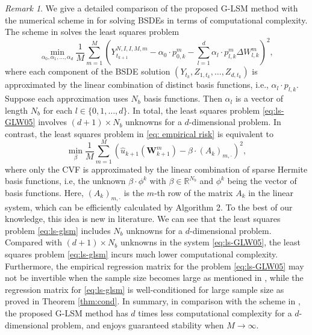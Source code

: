 \documentclass[10pt,a4paper]{amsart}
\numberwithin{equation}{section}
\numberwithin{algorithm}{section}
\theoremstyle{plain}
\theoremstyle{remark}
\newtheorem{remark}[remark]{Remark}
\begin{document}
\begin{remark}\label{rmk:complexity}
We give a detailed comparison of the proposed G-LSM method with the numerical scheme in \cite{gobet2005regression} for solving BSDEs in terms of computational complexity. The scheme in \cite{gobet2005regression} solves the least squares problem 
    \begin{equation} \label{eq:ls-GLW05}
        \min_{\alpha_0, \alpha_1, \dots, \alpha_d} \frac{1}{M}\sum_{m=1}^M \left( Y_{t_{k+1}}^{N, I, I, M, m} - \alpha_0\cdot p_{0,k}^m - \sum_{l=1}^d \alpha_l \cdot p_{l,k}^m \Delta W_{l,k}^m \right)^2,
    \end{equation}
where each component of the BSDE solution $(Y_{t_k}, Z_{1, t_k}, \dots, Z_{d, t_k})$ is approximated by the linear combination of distinct basis functions, i.e., $\alpha_l\cdot p_{l,k}$. Suppose each approximation uses $N_b$ basis functions. Then $\alpha_l$ is a vector of length $N_b$ for each $l\in \{0, 1,\dots, d\}$. In total, the least squares problem \eqref{eq:ls-GLW05} involves $(d+1)\times N_b$ unknowns for a $d$-dimensional problem.  In contrast, the least squares problem in \eqref{eq: empirical risk} is equivalent to 
    \begin{equation} \label{eq:ls-glsm}
        \min_{\beta} \frac{1}{M}\sum_{m=1}^M \left( \hat{u}_{k+1}(\mathbf{W}_{k+1}^m) - \beta \cdot (A_k)_{m,\cdot} \right)^2,
    \end{equation}
    where only the CVF is approximated by the linear combination of sparse Hermite basis functions, i.e, the unknown $\beta \cdot \phi^k$ with $\beta\in \mathbb{R}^{N_b}$ and $\phi^k$ being the vector of basis functions. Here, $(A_k)_{m,\cdot}$ is the $m$-th row of the matrix $A_k$ in the linear system, which can be efficiently calculated by Algorithm 2. To the best of our knowledge, this idea is new in literature. We can see that the least squares problem \eqref{eq:ls-glsm} includes $N_b$ unknowns for a $d$-dimensional problem. Compared with $(d+1)\times N_b$ unknowns in the system \eqref{eq:ls-GLW05}, the least squares problem \eqref{eq:ls-glsm} incurs much lower computational complexity. Furthermore, the empirical regression matrix for the problem \eqref{eq:ls-GLW05} may not be invertible when the sample size becomes large as mentioned in \cite[page 2178]{gobet2005regression}, while the regression matrix for \eqref{eq:ls-glsm} is well-conditioned for large sample size as proved in Theorem \ref{thm:cond}.  In summary, in comparison with the scheme in \cite{gobet2005regression}, the proposed G-LSM method has $d$ times less computational complexity for  a $d$-dimensional problem, and  enjoys guaranteed stability when $M\to \infty$.
\end{remark}
\end{document}

